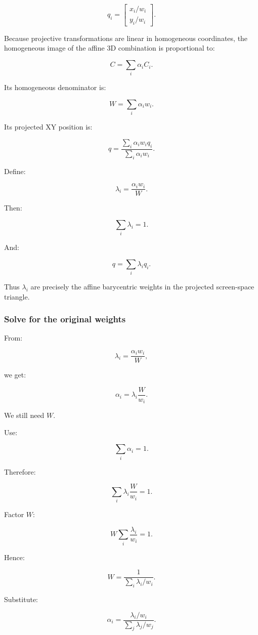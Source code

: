 \[
 q_i= \begin{bmatrix} x_i/w_i\\ y_i/w_i \end{bmatrix}.
\]

Because projective transformations are linear in homogeneous coordinates, the homogeneous image of the affine 3D combination is proportional to:

\[
 \boxed{ C=\sum_i\alpha_iC_i }.
\]

Its homogeneous denominator is:

\[
 \boxed{ W=\sum_i\alpha_iw_i }.
\]

Its projected XY position is:

\[
 q= \frac{ \sum_i\alpha_iw_iq_i }{ \sum_i\alpha_iw_i }.
\]

Define:

\[
 \boxed{ \lambda_i=\frac{\alpha_iw_i}{W} }.
\]

Then:

\[
 \sum_i\lambda_i=1.
\]

And:

\[
 q=\sum_i\lambda_iq_i.
\]

Thus \(\lambda_i\) are precisely the affine barycentric weights in the projected screen-space triangle.

\subsubsection{Solve for the original weights}\label{solve-for-the-original-weights}

From:

\[
 \lambda_i=\frac{\alpha_iw_i}{W},
\]

we get:

\[
 \alpha_i=\lambda_i\frac W{w_i}.
\]

We still need \(W\).

Use:

\[
 \sum_i\alpha_i=1.
\]

Therefore:

\[
 \sum_i\lambda_i\frac W{w_i}=1.
\]

Factor \(W\):

\[
 W\sum_i\frac{\lambda_i}{w_i}=1.
\]

Hence:

\[
 \boxed{ W= \frac1{\sum_i\lambda_i/w_i} }.
\]

Substitute:

\[
 \boxed{ \alpha_i= \frac{\lambda_i/w_i} {\sum_j\lambda_j/w_j} }.
\]

